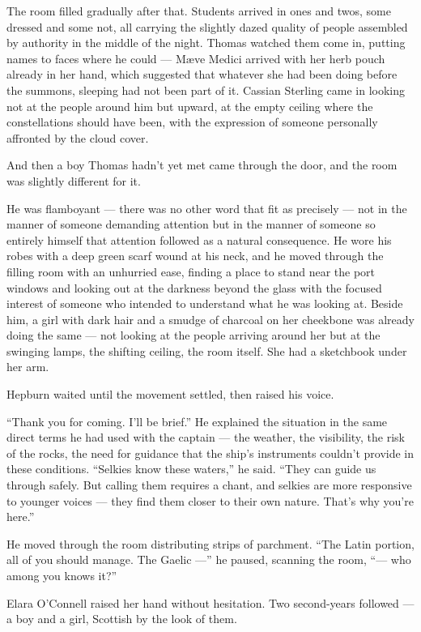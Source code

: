 The room filled gradually after that. Students arrived in ones and twos, some dressed and some not, all carrying the slightly dazed quality of people assembled by authority in the middle of the night. Thomas watched them come in, putting names to faces where he could --- Mæve Medici arrived with her herb pouch already in her hand, which suggested that whatever she had been doing before the summons, sleeping had not been part of it. Cassian Sterling came in looking not at the people around him but upward, at the empty ceiling where the constellations should have been, with the expression of someone personally affronted by the cloud cover.

And then a boy Thomas hadn't yet met came through the door, and the room was slightly different for it.

He was flamboyant --- there was no other word that fit as precisely --- not in the manner of someone demanding attention but in the manner of someone so entirely himself that attention followed as a natural consequence. He wore his robes with a deep green scarf wound at his neck, and he moved through the filling room with an unhurried ease, finding a place to stand near the port windows and looking out at the darkness beyond the glass with the focused interest of someone who intended to understand what he was looking at. Beside him, a girl with dark hair and a smudge of charcoal on her cheekbone was already doing the same --- not looking at the people arriving around her but at the swinging lamps, the shifting ceiling, the room itself. She had a sketchbook under her arm.

Hepburn waited until the movement settled, then raised his voice.

\enquote{Thank you for coming. I'll be brief.} He explained the situation in the same direct terms he had used with the captain --- the weather, the visibility, the risk of the rocks, the need for guidance that the ship's instruments couldn't provide in these conditions. \enquote{Selkies know these waters,} he said. \enquote{They can guide us through safely. But calling them requires a chant, and selkies are more responsive to younger voices --- they find them closer to their own nature. That's why you're here.}

He moved through the room distributing strips of parchment. \enquote{The Latin portion, all of you should manage. The Gaelic ---} he paused, scanning the room, \enquote{--- who among you knows it?}

Elara O'Connell raised her hand without hesitation. Two second-years followed --- a boy and a girl, Scottish by the look of them.


